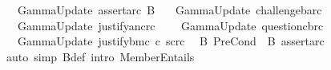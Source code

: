 \begin{isabellebody}
\isamarkupfalse%
\ {\isachardoublequoteopen}{\isasymGamma}\ {\isasymequiv}\ GammaUpdate\ assert{\isacharbrackleft}{\kern0pt}a{\isacharcomma}{\kern0pt}r\isactrlsup c{\isacharbrackright}{\kern0pt}\ {\isasymGamma}\isactrlsub B{\isachardoublequoteclose}\isanewline
{}\isamarkupfalse%
\ {\isachardoublequoteopen}{\isasymGamma}\ {\isasymequiv}\ GammaUpdate\ challenge{\isacharbrackleft}{\kern0pt}b{\isacharcomma}{\kern0pt}a{\isacharcomma}{\kern0pt}r\isactrlsup c{\isacharbrackright}{\kern0pt}\ {\isasymGamma}\isanewline
{}\isamarkupfalse%
\ {\isachardoublequoteopen}{\isasymGamma}\ {\isasymequiv}\ GammaUpdate\ justify{\isacharbrackleft}{\kern0pt}a{\isacharcomma}{\kern0pt}n\isactrlsup c{\isasymturnstile}\isactrlsup {\isasymoplus}r\isactrlsup c{\isacharbrackright}{\kern0pt}\ {\isasymGamma}\isanewline
{}\isamarkupfalse%
\ {\isachardoublequoteopen}{\isasymGamma}\ {\isasymequiv}\ GammaUpdate\ question{\isacharbrackleft}{\kern0pt}c{\isacharcomma}{\kern0pt}b{\isacharcomma}{\kern0pt}r\isactrlsup c{\isacharbrackright}{\kern0pt}\ {\isasymGamma}\isanewline
{}\isamarkupfalse%
\ {\isachardoublequoteopen}{\isasymGamma}\ {\isasymequiv}\ GammaUpdate\ justify{\isacharbrackleft}{\kern0pt}b{\isacharcomma}{\kern0pt}m\isactrlsup c\ {\isasymand}\isactrlsup c\ s\isactrlsup c{\isasymturnstile}\isactrlsup {\isasymominus}r\isactrlsup c{\isacharbrackright}{\kern0pt}\ {\isasymGamma}\isanewline
\isanewline
{}\isamarkupfalse%
\ B{}{\isacharcolon}{\kern0pt}\ {\isachardoublequoteopen}PreCond\ {\isacharbrackleft}{\kern0pt}{\isacharbrackright}{\kern0pt}\ {\isasymGamma}\isactrlsub B\ assert{\isacharbrackleft}{\kern0pt}a{\isacharcomma}{\kern0pt}r\isactrlsup c{\isacharbrackright}{\kern0pt}{\isachardoublequoteclose}\isanewline
%
\isadelimproof
\ \ %
\endisadelimproof
%
\isatagproof
{}\isamarkupfalse%
\ {\isacharparenleft}{\kern0pt}auto\ simp{\isacharcolon}{\kern0pt}\ {\isasymGamma}\isactrlsub B{\isacharunderscore}{\kern0pt}def\ intro{\isacharbang}{\kern0pt}{\isacharcolon}{\kern0pt}\ MemberEntails{\isacharparenright}{\kern0pt}%
\endisatagproof
{\isafoldproof}%
%
\isadelimproof
\isanewline
%
\endisadelimproof

\end{isabellebody}
